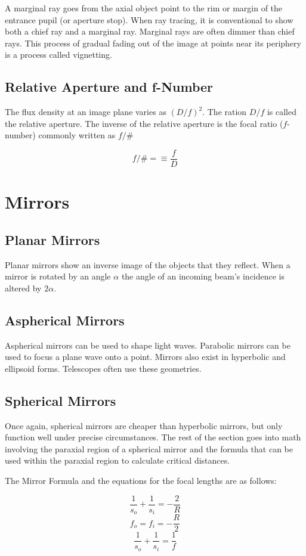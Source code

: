 \documentclass[12pt]{report}
\begin{document}
A marginal ray goes from the axial object point to the rim or margin of the entrance pupil (or aperture stop). When ray tracing, it is conventional to show both a chief ray and a marginal ray. Marginal rays are often dimmer than chief rays. This process of gradual fading out of the image at points near its periphery is a process called vignetting. 

\subsection{Relative Aperture and f-Number}
The flux density at an image plane varies as $(D/f)^2$. The ration $D/f$ is called the relative aperture. The inverse of the relative aperture is the focal ratio ($f$-number) commonly written as $f/\#$

\[f/\# = \equiv \frac{f}{D}\]

\section{Mirrors}
\subsection{Planar Mirrors}
Planar mirrors show an inverse image of the objects that they reflect. When a mirror is rotated by an angle $\alpha$ the angle of an incoming beam's incidence is altered by $2\alpha$.

\subsection{Aspherical Mirrors}
Aspherical mirrors can be used to shape light waves. Parabolic mirrors can be used to focus a plane wave onto a point. Mirrors also exist in hyperbolic and ellipsoid forms. Telescopes often use these geometries. 
\subsection{Spherical Mirrors}
Once again, spherical mirrors are cheaper than hyperbolic mirrors, but only function well under precise circumstances. The rest of the section goes into math involving the paraxial region of a spherical mirror and the formula that can be used within the paraxial region to calculate critical distances.

The Mirror Formula and the equations for the focal lengths are as follows:

\begin{equation}
\frac{1}{s_o}+\frac{1}{s_i} = -\frac{2}{R}
\end{equation}
\begin{equation}
f_o = f_i = -\frac{R}{2} 
\end{equation}
\begin{equation}
\frac{1}{s_o}+\frac{1}{s_i} = \frac{1}{f}
\end{equation}
\end{document}
